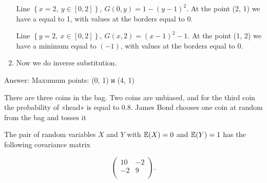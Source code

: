 \documentclass[addpoints, answers]{exam} %
\begin{document}
\begin{questions}
\begin{solution}
\begin{enumerate}
Line $\left\{x=2,\ y\in \left[0,2\right]\right\},\ G\left(0,y\right)=1-{\left(y-1\right)}^2$. At the point (2, 1) we have a \textbf{} equal to 1, with values at the borders equal to $0$.

Line $\left\{y=2,\ x\in \left[0,2\right]\right\},\ G\left(x,2\right)={\left(x-1\right)}^2-1$. At the point (1, 2) we have a minimum equal to $(-1)$, with values at the borders equal to 0.

\item  Now we do inverse substitution.
\end{enumerate}

Answer: Maxumum points: (0, 1) и (4, 1)


\end{solution}

\newpage

\question
There are three coins in the bag. Two coins are unbiased, and for the third coin the probability of «head» is equal to $0.8$. James Bond chooses one coin at random from the bag and tosses it



\question
The pair of random variables $X$ and $Y$ with $\mathbb{E}(X)=0$ and $\mathbb{E}(Y)=1$ has the following covariance matrix


\[
\begin{pmatrix}
10 & -2 \\
-2 & 9 \\
\end{pmatrix}.
\]




\end{questions}
\end{document}
